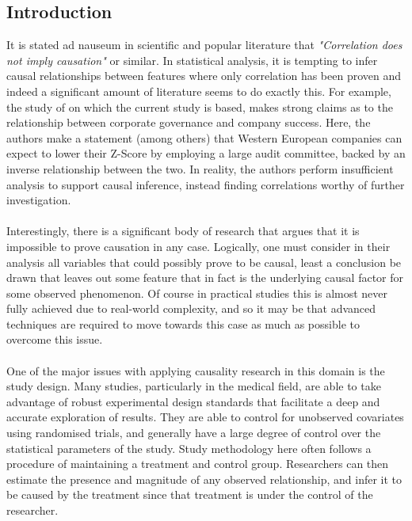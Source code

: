 {\subsection{Introduction}
{It is stated ad nauseum in scientific and popular literature that {\it "Correlation does not imply causation"} or similar. In statistical analysis, it is tempting to infer causal relationships between features where only correlation has been proven and indeed a significant amount of literature seems to do exactly this. For example, the study of \cite{moldovan2015learning} on which the current study is based, makes strong claims as to the relationship between corporate governance and company success. Here, the authors make a statement (among others) that Western European companies can expect to lower their Z-Score by employing a large audit committee, backed by an inverse relationship between the two. In reality, the authors perform insufficient analysis to support causal inference, instead finding correlations worthy of further investigation. \\\\
Interestingly, there is a significant body of research that argues that it is impossible to prove causation in any case. Logically, one must consider in their analysis all variables that could possibly prove to be causal, least a conclusion be drawn that leaves out some feature that in fact is the underlying causal factor for some observed phenomenon. Of course in practical studies this is almost never fully achieved due to real-world complexity, and so it may be that advanced techniques are required to move towards this case as much as possible to overcome this issue.  \\\\
One of the major issues with applying causality research in this domain is the study design. Many studies, particularly in the medical field, are able to take advantage of robust experimental design standards that facilitate a deep and accurate exploration of results. They are able to control for unobserved covariates using randomised trials, and generally have a large degree of control over the statistical parameters of the study. Study methodology here often follows a procedure of maintaining a treatment and control group. Researchers can then estimate the presence and magnitude of any observed relationship, and infer it to be caused by the treatment since that treatment is under the control of the researcher.  \\\\
}}
